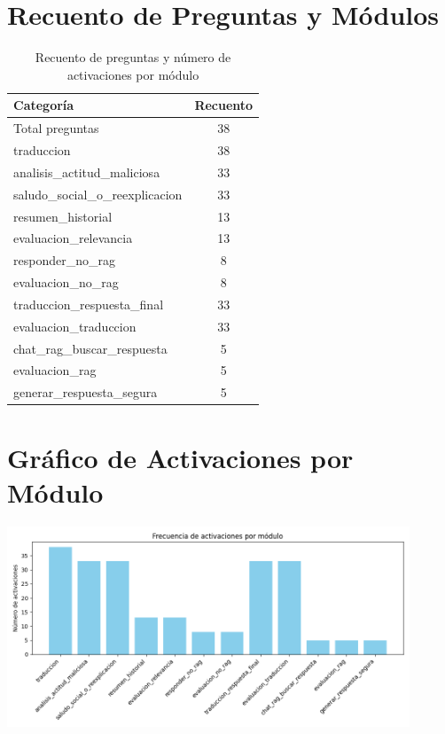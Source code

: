 \documentclass{article}
\begin{document}
\section*{Recuento de Preguntas y Módulos}
\begin{table}[h]
\centering
\begin{tabular}{lc}
\toprule
\textbf{Categoría} & \textbf{Recuento} \\
\midrule
Total preguntas & 38 \\
traduccion & 38 \\
analisis\_actitud\_maliciosa & 33 \\
saludo\_social\_o\_reexplicacion & 33 \\
resumen\_historial & 13 \\
evaluacion\_relevancia & 13 \\
responder\_no\_rag & 8 \\
evaluacion\_no\_rag & 8 \\
traduccion\_respuesta\_final & 33 \\
evaluacion\_traduccion & 33 \\
chat\_rag\_buscar\_respuesta & 5 \\
evaluacion\_rag & 5 \\
generar\_respuesta\_segura & 5 \\
\bottomrule
\end{tabular}
\caption{Recuento de preguntas y número de activaciones por módulo}
\label{tab:recuento_preguntas_modulos}
\end{table}

\section*{Gráfico de Activaciones por Módulo}
\begin{center}
\includegraphics[width=0.9\textwidth]{../graficos/modulos_frecuencia.png}
\end{center}
\end{document}
